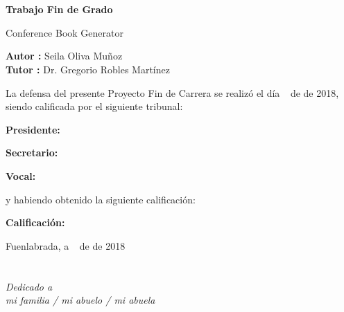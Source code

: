 \documentclass[a4paper, 12pt]{book}
\begin{document}
\newpage
\mbox{}
\thispagestyle{empty} %


\clearpage
{}
\chapter*{}

\vspace{-4cm}
\begin{center}
\LARGE
\textbf{Trabajo Fin de Grado}

\vspace{1cm}
\large
Conference Book Generator

\vspace{1cm}
\large
\textbf{Autor :} Seila Oliva Muñoz \\
\textbf{Tutor :} Dr. Gregorio Robles Martínez

\end{center}

\vspace{1cm}
La defensa del presente Proyecto Fin de Carrera se realizó el día \qquad$\;\,$ de \qquad\qquad\qquad\qquad \newline de 2018, siendo calificada por el siguiente tribunal:


\vspace{0.5cm}
\textbf{Presidente:}

\vspace{1.2cm}
\textbf{Secretario:}

\vspace{1.2cm}
\textbf{Vocal:}


\vspace{1.2cm}
y habiendo obtenido la siguiente calificación:

\vspace{1cm}
\textbf{Calificación:}


\vspace{1cm}
\begin{flushright}
Fuenlabrada, a \qquad$\;\,$ de \qquad\qquad\qquad\qquad de 2018
\end{flushright}


\chapter*{}
\begin{flushright}
\textit{Dedicado a \\
mi familia / mi abuelo / mi abuela}
\end{flushright}
\end{document}
